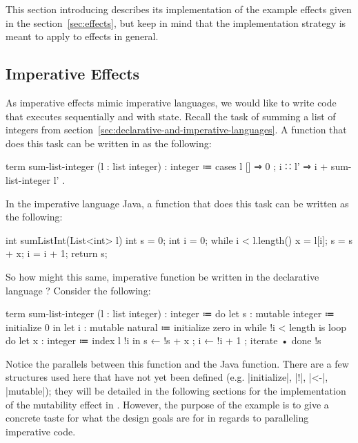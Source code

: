 This section introducing \LangB describes its implementation of the example effects given in the section~\ref{sec:effects}, but keep in mind that the implementation strategy is meant to apply to effects in general.

\subsection{Imperative Effects}

As imperative effects mimic imperative languages, we would like to write code that executes sequentially and with state.
Recall the task of summing a list of integers from section~\ref{sec:declarative-and-imperative-languages}.
A function that does this task can be written in \LangA as the following:
%
\begin{snippet}[caption={Sum a list of integers (declaratively)}]
term sum-list-integer (l : list integer) : integer
  ≔ cases l
      { []     ⇒ 0
      ; i ∷ l' ⇒ i + sum-list-integer l' }.
\end{snippet}
%
In the imperative language Java,
a function that does this task can be written as the following:
%
\begin{snippet-Java}[caption={Sum a list of integers (imperatively in Java)}]
int sumListInt(List<int> l)
  {
    int s = 0;
    int i = 0;
    while i < l.length()
      {
        x = l[i];
        s = s + x;
        i = i + 1;
      }
    return s;
  }
\end{snippet-Java}
So how might this same, imperative function be written in the declarative language \LangB?
Consider the following:
\begin{snippet}[caption={Sum a list of integers (imperatively in \LangB)}]
term sum-list-integer (l : list integer) : integer
  ≔ do
      { let s : mutable integer ≔ initialize 0 in
        let i : mutable natural ≔ initialize zero in
        while !i < length is
          loop do
            { let x : integer ≔ index l !i in
              s ← !s + x
            ; i ← !i + 1
            ; iterate • }
          done !s }
\end{snippet}
Notice the parallels between this function and the Java function.
There are a few structures used here that have not yet been defined (e.g. \code|initialize|, \code|!|, \code|<-|, \code|mutable|); they will be detailed in the following sections for the implementation of the mutability effect in \LangB.
However, the purpose of the example is to give a concrete taste for what the design goals are for \LangB in regards to paralleling imperative code.

